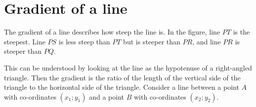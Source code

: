 %     
%     
%     
      \label{m39108*uid40}
            \section{ Gradient of a line}
            \nopagebreak
\label{m39108*id67971}The gradient of a line describes how steep the line is. In the figure, line $PT$ is the steepest. Line $PS$ is less steep than $PT$ but is steeper than $PR$, and line $PR$ is steeper than $PQ$.\par 
    \setcounter{subfigure}{0}
 	\begin{figure}[H] %
    \begin{center}
    \end{center}
 \end{figure}        
         This can be understood by looking at the line as the hypotenuse of a right-angled triangle. Then the gradient is the ratio of the length of the vertical side of the triangle to the horizontal side of the triangle. Consider a line between a point $A$ with co-ordinates $\left({x}_{1};{y}_{1}\right)$ and a point $B$ with co-ordinates $\left({x}_{2};{y}_{2}\right)$.\par 
